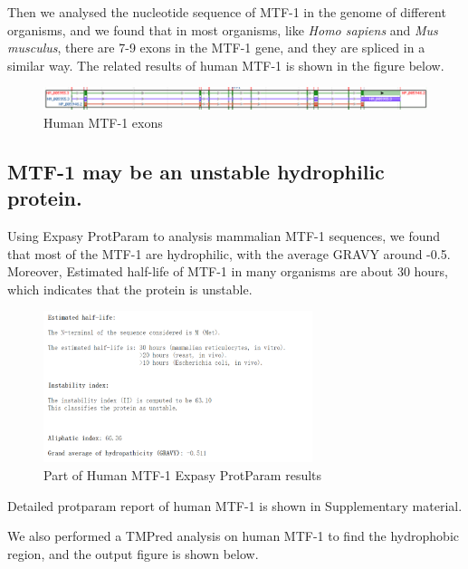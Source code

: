 Then we analysed the nucleotide sequence of MTF-1 in the genome of different organisms, and we found that in most organisms, like \textit{Homo sapiens} and \textit{Mus musculus}, there are 7-9 exons in the MTF-1 gene, and they are spliced in a similar way. The related results of human MTF-1 is shown in the figure below.

\begin{figure}[H]
    \centering
    \includegraphics[width=1\textwidth]{image/MTFE.png}
    \caption{Human MTF-1 exons}
    \label{MSAT}
\end{figure}

\subsection{MTF-1 may be an unstable hydrophilic protein.}

Using Expasy ProtParam to analysis mammalian MTF-1 sequences, we found that most of the MTF-1 are hydrophilic, with the average GRAVY around -0.5. Moreover, Estimated half-life of MTF-1 in many organisms are about 30 hours, which indicates that the protein is unstable.

\begin{figure}[H]
    \centering
    \includegraphics[width=0.7\textwidth]{image/EXPP.png}
    \caption{Part of Human MTF-1 Expasy ProtParam results}
    \label{EXPP}
\end{figure}

Detailed protparam report of human MTF-1 is shown in Supplementary material.

We also performed a TMPred analysis on human MTF-1 to find the hydrophobic region, and the output figure is shown below.

